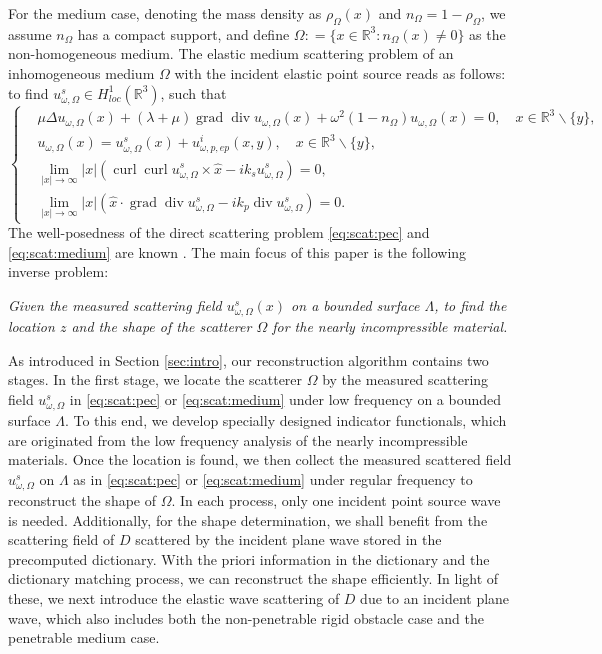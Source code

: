 \documentclass[a4paper,11pt]{article}
\theoremstyle{remark}
\theoremstyle{definition}
\numberwithin{equation}{section}
\DeclareMathOperator{\curl}{curl}
\DeclareMathOperator{\Div}{div}
\DeclareMathOperator{\grad}{grad}
\begin{document}
For the medium case, denoting the mass density as $\rho_{\Omega}(x)$ and $n_{\Omega} =1 -\rho_{\Omega}$, we assume $n_{\Omega}$ has a compact support, and define
$\Omega: = \{x \in \mathbb{R}^3: n_{\Omega}(x) \neq 0\}$ as the non-homogeneous medium.
The elastic medium scattering problem of an inhomogeneous medium $\Omega$ with the incident elastic point source reads as follows:
to find $u_{\omega,\Omega}^s \in H^{1}_{loc}(\mathbb{R}^3)$, such that
\begin{equation}\label{eq:scat:medium}
\begin{cases}
&\mu \Delta u_{\omega,\Omega}(x) +(\lambda + \mu) \grad \Div u_{\omega,\Omega}(x) + \omega^2  (1-n_{\Omega}) u_{\omega,\Omega}(x)  = 0, \quad x \in \mathbb{R}^3\backslash \{y\},  \\
& u_{\omega,\Omega}(x) = u_{\omega,\Omega}^s(x) + u_{\omega,p,ep}^i(x,y), \quad  x \in \mathbb{R}^3\backslash \{y\},  \\
& \displaystyle{\lim_{|x| \rightarrow \infty}|x|( \curl \curl u_{\omega,\Omega}^s \times \hat{x} -i k_{s}u_{\omega,\Omega}^s) = 0},  \\
& \displaystyle{\lim_{|x| \rightarrow \infty}|x|( \hat{x}\cdot \grad \Div u_{\omega,\Omega}^s -ik_p \Div u_{\omega,\Omega}^s) = 0}.
\end{cases}
\end{equation}
The well-posedness of the direct scattering problem \eqref{eq:scat:pec} and \eqref{eq:scat:medium} are known \cite{PH, PH0, PHhab}.
The main focus of this paper is the following inverse problem:

\emph{Given the measured scattering field $u_{\omega,\Omega}^s(x)$ on a bounded surface $\Lambda$, to find the location $z$ and the shape of the scatterer $\Omega$ for the nearly incompressible material.}



 As introduced in Section \ref{sec:intro}, our reconstruction algorithm contains two stages. In the first stage, we locate the scatterer $\Omega$ by the measured scattering field $u_{\omega,\Omega}^s$ in \eqref{eq:scat:pec} or \eqref{eq:scat:medium} under low frequency on a bounded surface $\Lambda$.  To this end, we develop specially designed indicator functionals, which are originated from the low frequency analysis of the nearly incompressible materials. Once the location is found, we then collect the measured scattered field $u_{\omega,\Omega}^s$ on $\Lambda$ as in \eqref{eq:scat:pec} or \eqref{eq:scat:medium} under regular frequency to reconstruct the shape of $\Omega$. In each process, only one incident point source wave is needed. Additionally, for the shape determination, we shall benefit from the scattering field of $D$ scattered by the incident plane wave stored in the precomputed dictionary. With the priori information in the dictionary and the dictionary matching process, we can reconstruct the shape efficiently. In light of these, we next introduce the elastic wave scattering of $D$ due to an incident plane wave, which also includes both the non-penetrable rigid obstacle case and the penetrable medium case.
\end{document}
